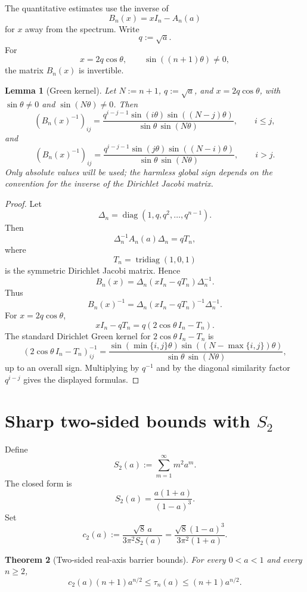 \documentclass[11pt]{amsart}
\numberwithin{equation}{section}
\DeclareMathOperator{\tridiag}{tridiag}
\DeclareMathOperator{\diag}{diag}
\newtheorem{theorem}{Theorem}[section]
\newtheorem{lemma}[theorem]{Lemma}
\begin{document}
The quantitative estimates use the inverse of
\[
B_n(x)=xI_n-A_n(a)
\]
for \(x\) away from the spectrum.  Write
\[
q:=\sqrt a.
\]
For
\[
x=2q\cos\theta,
\qquad
\sin((n+1)\theta)\ne0,
\]
the matrix \(B_n(x)\) is invertible.

\begin{lemma}[Green kernel]\label{lem:green}
Let \(N:=n+1\), \(q:=\sqrt a\), and \(x=2q\cos\theta\), with \(\sin\theta\ne0\) and \(\sin(N\theta)\ne0\).  Then
\[
(B_n(x)^{-1})_{ij}
=
\frac{
q^{i-j-1}\sin(i\theta)\sin((N-j)\theta)
}{
\sin\theta\,\sin(N\theta)
},
\qquad i\le j,
\]
and
\[
(B_n(x)^{-1})_{ij}
=
\frac{
q^{i-j-1}\sin(j\theta)\sin((N-i)\theta)
}{
\sin\theta\,\sin(N\theta)
},
\qquad i>j.
\]
Only absolute values will be used; the harmless global sign depends on the convention for the inverse of the Dirichlet Jacobi matrix.
\end{lemma}

\begin{proof}
Let
\[
\Delta_n=\diag(1,q,q^2,\dots,q^{n-1}).
\]
Then
\[
\Delta_n^{-1}A_n(a)\Delta_n=qT_n,
\]
where
\[
T_n=\tridiag(1,0,1)
\]
is the symmetric Dirichlet Jacobi matrix.  Hence
\[
B_n(x)
=
\Delta_n(xI_n-qT_n)\Delta_n^{-1}.
\]
Thus
\[
B_n(x)^{-1}
=
\Delta_n(xI_n-qT_n)^{-1}\Delta_n^{-1}.
\]
For \(x=2q\cos\theta\),
\[
xI_n-qT_n
=
q(2\cos\theta\,I_n-T_n).
\]
The standard Dirichlet Green kernel for \(2\cos\theta\,I_n-T_n\) is
\[
\left(2\cos\theta\,I_n-T_n\right)^{-1}_{ij}
=
\frac{
\sin(\min\{i,j\}\theta)\sin((N-\max\{i,j\})\theta)
}{
\sin\theta\,\sin(N\theta)
},
\]
up to an overall sign.  Multiplying by \(q^{-1}\) and by the diagonal similarity factor \(q^{i-j}\) gives the displayed formulas.
\end{proof}

\section{Sharp two-sided bounds with \texorpdfstring{\(S_2\)}{S2}}

Define
\[
S_2(a):=\sum_{m=1}^{\infty}m^2a^m.
\]
The closed form is
\[
S_2(a)=\frac{a(1+a)}{(1-a)^3}.
\]
Set
\[
c_2(a)
:=
\frac{\sqrt8\,a}{3\pi^2S_2(a)}
=
\frac{\sqrt8(1-a)^3}{3\pi^2(1+a)}.
\]

\begin{theorem}[Two-sided real-axis barrier bounds]\label{thm:tau-bounds}
For every \(0<a<1\) and every \(n\ge2\),
\[
c_2(a)(n+1)a^{n/2}
\le
\tau_n(a)
\le
(n+1)a^{n/2}.
\]
\end{theorem}
\end{document}
